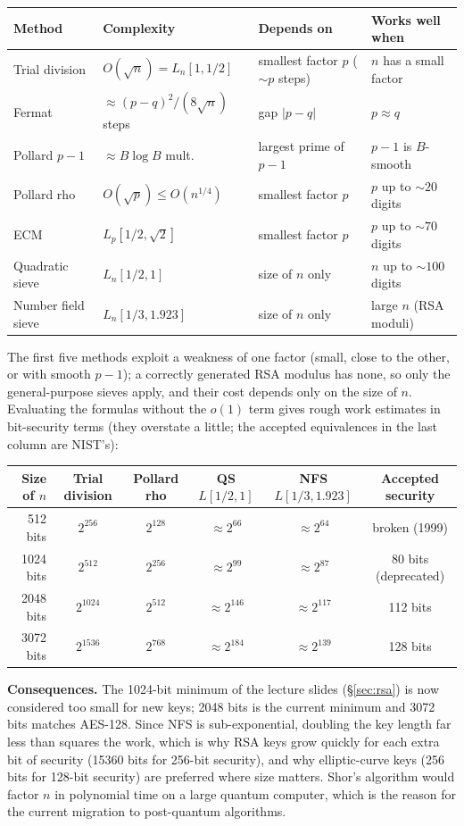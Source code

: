 \begin{center}\small
\begin{tabular}{@{}llll@{}}
\toprule
Method & Complexity & Depends on & Works well when\\
\midrule
Trial division & $O(\sqrt n) = L_n[1, 1/2]$ & smallest factor $p$ ($\sim p$ steps) & $n$ has a small factor\\
Fermat & $\approx (p - q)^2/(8\sqrt n)$ steps & gap $|p - q|$ & $p \approx q$\\
Pollard $p - 1$ & $\approx B \log B$ mult.\ & largest prime of $p - 1$ & $p - 1$ is $B$-smooth\\
Pollard rho & $O(\sqrt p) \le O(n^{1/4})$ & smallest factor $p$ & $p$ up to $\sim 20$ digits\\
ECM & $L_p[1/2, \sqrt 2]$ & smallest factor $p$ & $p$ up to $\sim 70$ digits\\
Quadratic sieve & $L_n[1/2, 1]$ & size of $n$ only & $n$ up to $\sim 100$ digits\\
Number field sieve & $L_n[1/3, 1.923]$ & size of $n$ only & large $n$ (RSA moduli)\\
\bottomrule
\end{tabular}
\end{center}
The first five methods exploit a weakness of one factor (small, close to the other, or with smooth $p - 1$); a correctly generated RSA modulus has none, so only the general-purpose sieves apply, and their cost depends only on the size of $n$. Evaluating the formulas without the $o(1)$ term gives rough work estimates in bit-security terms (they overstate a little; the accepted equivalences in the last column are NIST's):
\begin{center}\small
\begin{tabular}{@{}rccccc@{}}
\toprule
Size of $n$ & Trial division & Pollard rho & QS $L[1/2, 1]$ & NFS $L[1/3, 1.923]$ & Accepted security\\
\midrule
512 bits & $2^{256}$ & $2^{128}$ & $\approx 2^{66}$ & $\approx 2^{64}$ & broken (1999)\\
1024 bits & $2^{512}$ & $2^{256}$ & $\approx 2^{99}$ & $\approx 2^{87}$ & 80 bits (deprecated)\\
2048 bits & $2^{1024}$ & $2^{512}$ & $\approx 2^{146}$ & $\approx 2^{117}$ & 112 bits\\
3072 bits & $2^{1536}$ & $2^{768}$ & $\approx 2^{184}$ & $\approx 2^{139}$ & 128 bits\\
\bottomrule
\end{tabular}
\end{center}
\textbf{Consequences.} The 1024-bit minimum of the lecture slides (\S\ref{sec:rsa}) is now considered too small for new keys; 2048 bits is the current minimum and 3072 bits matches AES-128. Since NFS is sub-exponential, doubling the key length far less than squares the work, which is why RSA keys grow quickly for each extra bit of security (15360 bits for 256-bit security), and why elliptic-curve keys (256 bits for 128-bit security) are preferred where size matters. Shor's algorithm would factor $n$ in polynomial time on a large quantum computer, which is the reason for the current migration to post-quantum algorithms.


